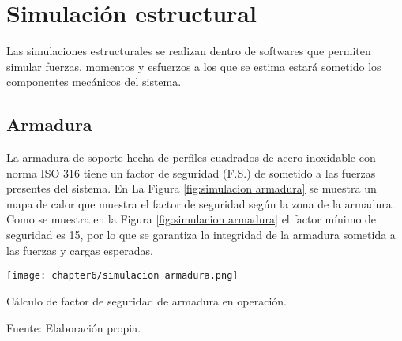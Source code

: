 
\section{Simulación estructural}

Las simulaciones estructurales se realizan dentro de softwares que permiten simular fuerzas, momentos y esfuerzos a los que se estima estará sometido los componentes mecánicos del sistema.

\subsection{Armadura}

La armadura de soporte hecha de perfiles cuadrados de acero inoxidable con norma ISO 316 tiene un factor de seguridad (F.S.) de sometido a las fuerzas presentes del sistema. En La Figura \ref{fig:simulacion armadura} se muestra un mapa de calor que muestra el factor de seguridad según la zona de la armadura. Como se muestra en la Figura  \ref{fig:simulacion armadura} el factor mínimo de seguridad es 15, por lo que se garantiza la integridad de la armadura sometida a las fuerzas y cargas esperadas.

\begin{myfigure}[H]
	\footnotesize\centering
	\texttt{[image: chapter6/simulacion armadura.png]}
	\caption{Cálculo de factor de seguridad de armadura en operación.}
	\begin{myflushcenter}
		Fuente: Elaboración propia.
	\end{myflushcenter}
	\label{fig:simulacion armadura}
\end{myfigure}



